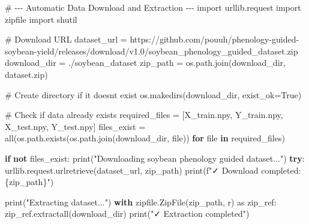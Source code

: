 \documentclass[
  letterpaper,
  DIV=11,
  numbers=noendperiod]{scrreprt}
\newenvironment{Shaded}{\begin{snugshade}}{\end{snugshade}}
\newcommand{\BuiltInTok}[1]{\textcolor[rgb]{0.00,0.23,0.31}{#1}}
\newcommand{\CommentTok}[1]{\textcolor[rgb]{0.37,0.37,0.37}{#1}}
\newcommand{\ControlFlowTok}[1]{\textcolor[rgb]{0.00,0.23,0.31}{\textbf{#1}}}
\newcommand{\ImportTok}[1]{\textcolor[rgb]{0.00,0.46,0.62}{#1}}
\newcommand{\KeywordTok}[1]{\textcolor[rgb]{0.00,0.23,0.31}{\textbf{#1}}}
\newcommand{\NormalTok}[1]{\textcolor[rgb]{0.00,0.23,0.31}{#1}}
\newcommand{\OperatorTok}[1]{\textcolor[rgb]{0.37,0.37,0.37}{#1}}
\newcommand{\SpecialCharTok}[1]{\textcolor[rgb]{0.37,0.37,0.37}{#1}}
\newcommand{\SpecialStringTok}[1]{\textcolor[rgb]{0.13,0.47,0.30}{#1}}
\newcommand{\StringTok}[1]{\textcolor[rgb]{0.13,0.47,0.30}{#1}}
\newcommand{\VariableTok}[1]{\textcolor[rgb]{0.07,0.07,0.07}{#1}}
\begin{document}
\begin{Shaded}
\begin{Highlighting}[]
\CommentTok{\# {-}{-}{-} Automatic Data Download and Extraction {-}{-}{-}}
\ImportTok{import}\NormalTok{ urllib.request}
\ImportTok{import}\NormalTok{ zipfile}
\ImportTok{import}\NormalTok{ shutil}

\CommentTok{\# Download URL}
\NormalTok{dataset\_url }\OperatorTok{=} \StringTok{\textquotesingle{}https://github.com/pouuh/phenology{-}guided{-}soybean{-}yield/releases/download/v1.0/soybean\_phenology\_guided\_dataset.zip\textquotesingle{}}
\NormalTok{download\_dir }\OperatorTok{=} \StringTok{\textquotesingle{}./soybean\_dataset\textquotesingle{}}
\NormalTok{zip\_path }\OperatorTok{=}\NormalTok{ os.path.join(download\_dir, }\StringTok{\textquotesingle{}dataset.zip\textquotesingle{}}\NormalTok{)}

\CommentTok{\# Create directory if it doesn\textquotesingle{}t exist}
\NormalTok{os.makedirs(download\_dir, exist\_ok}\OperatorTok{=}\VariableTok{True}\NormalTok{)}

\CommentTok{\# Check if data already exists}
\NormalTok{required\_files }\OperatorTok{=}\NormalTok{ [}\StringTok{\textquotesingle{}X\_train.npy\textquotesingle{}}\NormalTok{, }\StringTok{\textquotesingle{}Y\_train.npy\textquotesingle{}}\NormalTok{, }\StringTok{\textquotesingle{}X\_test.npy\textquotesingle{}}\NormalTok{, }\StringTok{\textquotesingle{}Y\_test.npy\textquotesingle{}}\NormalTok{]}
\NormalTok{files\_exist }\OperatorTok{=} \BuiltInTok{all}\NormalTok{(os.path.exists(os.path.join(download\_dir, }\BuiltInTok{file}\NormalTok{)) }\ControlFlowTok{for} \BuiltInTok{file} \KeywordTok{in}\NormalTok{ required\_files)}

\ControlFlowTok{if} \KeywordTok{not}\NormalTok{ files\_exist:}
    \BuiltInTok{print}\NormalTok{(}\StringTok{"Downloading soybean phenology guided dataset..."}\NormalTok{)}
    \ControlFlowTok{try}\NormalTok{:}
\NormalTok{        urllib.request.urlretrieve(dataset\_url, zip\_path)}
        \BuiltInTok{print}\NormalTok{(}\SpecialStringTok{f"✓ Download completed: }\SpecialCharTok{\{}\NormalTok{zip\_path}\SpecialCharTok{\}}\SpecialStringTok{"}\NormalTok{)}
        
        \BuiltInTok{print}\NormalTok{(}\StringTok{"Extracting dataset..."}\NormalTok{)}
        \ControlFlowTok{with}\NormalTok{ zipfile.ZipFile(zip\_path, }\StringTok{\textquotesingle{}r\textquotesingle{}}\NormalTok{) }\ImportTok{as}\NormalTok{ zip\_ref:}
\NormalTok{            zip\_ref.extractall(download\_dir)}
        \BuiltInTok{print}\NormalTok{(}\StringTok{"✓ Extraction completed"}\NormalTok{)}
        

\end{Highlighting}
\end{Shaded}
\end{document}

